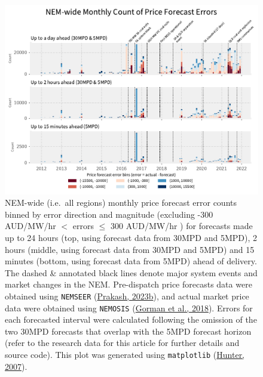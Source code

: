 \documentclass[12pt,a4paper,]{report}
\begin{document}
\begin{figure}
\hypertarget{fig:nem_historical_price_forecast_errors}{%
\centering
\includegraphics{source/figures/price_errors_nemwide_2012_2021.pdf}
\caption{NEM-wide (i.e.~all regions) monthly price forecast error counts
binned by error direction and magnitude (excluding -300 AUD/MW/hr \(<\)
errors \(\leq\) 300 AUD/MW/hr ) for forecasts made up to 24 hours (top,
using forecast data from 30MPD and 5MPD), 2 hours (middle, using
forecast data from 30MPD and 5MPD) and 15 minutes (bottom, using
forecast data from 5MPD) ahead of delivery. The dashed \& annotated
black lines denote major system events and market changes in the NEM.
Pre-dispatch price forecasts data were obtained using \texttt{NEMSEER}
(\protect\hyperlink{ref-prakashNEMSEER2023}{Prakash, 2023b}), and actual
market price data were obtained using \texttt{NEMOSIS}
(\protect\hyperlink{ref-gormanNEMOSISNEMOpen2018}{Gorman et al., 2018}).
Errors for each forecasted interval were calculated following the
omission of the two 30MPD forecasts that overlap with the 5MPD forecast
horizon (refer to the research data for this article for further details
and source code). This plot was generated using \texttt{matplotlib}
(\protect\hyperlink{ref-hunterMatplotlib2DGraphics2007}{Hunter,
2007}).}\label{fig:nem_historical_price_forecast_errors}
}
\end{figure}
\end{document}

